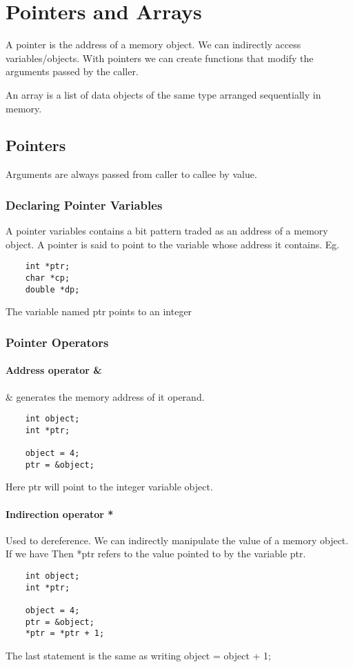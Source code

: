 \setcounter{chapter}{15}
\chapter{Pointers and Arrays}
A pointer is the address of a memory object. We can indirectly access variables/objects. With pointers we can create functions that modify the arguments passed by the caller. 

An array is a list of data objects of the same type arranged sequentially in memory. 


\section{Pointers}
Arguments are always passed from caller to callee by value.
\subsection{Declaring Pointer Variables}
A pointer variables contains a bit pattern traded as an address of a memory object. A pointer is said to point to the variable whose address it contains. Eg.
\begin{verbatim}
    int *ptr;
    char *cp;
    double *dp;
\end{verbatim}
The variable named ptr points to an integer


\subsection{Pointer Operators}
\subsubsection{Address operator \&}
$\&$ generates the memory address of it operand.
\begin{verbatim}
    int object;
    int *ptr;

    object = 4;
    ptr = &object;
\end{verbatim}

Here ptr will point to the integer variable object. 

\subsubsection{Indirection operator *}
Used to dereference. We can indirectly manipulate the value of a memory object. If we have   Then *ptr refers to the value pointed to by the variable ptr.  

\begin{verbatim}
    int object;
    int *ptr;

    object = 4;
    ptr = &object;
    *ptr = *ptr + 1;
\end{verbatim}
The last statement is the same as writing object = object + 1;

